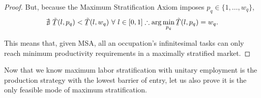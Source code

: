 \documentclass[hidelinks, nonatbib]{elsarticle}
\begin{document}
\begin{lemma}
\begin{proof}
        But, because the Maximum Stratification Axiom imposes $p_q \in \{1,\dots, w_q \}$,
        \begin{gather}
            \nexists \
            \underaccent{\bar}{\tilde{T}}(l, p_q)
            <
            \underaccent{\bar}{\tilde{T}}(l, w_q)
            \
            \forall
            \
            l \in [0,1]
            \therefore
            \arg\min_{p_q}{
                \underaccent{\bar}{\tilde{T}}(l, p_q)
            }
            = w_q
            .
        \end{gather}

        This means that, given MSA, all an occupation's infinitesimal tasks can only reach minimum productivity requirements in a maximally stratified  market.
    \end{proof}
\end{lemma}

Now that we know maximum labor stratification with unitary employment is the production strategy with the lowest barrier of entry, let us also prove it is the only feasible mode of maximum stratification.
\end{document}
